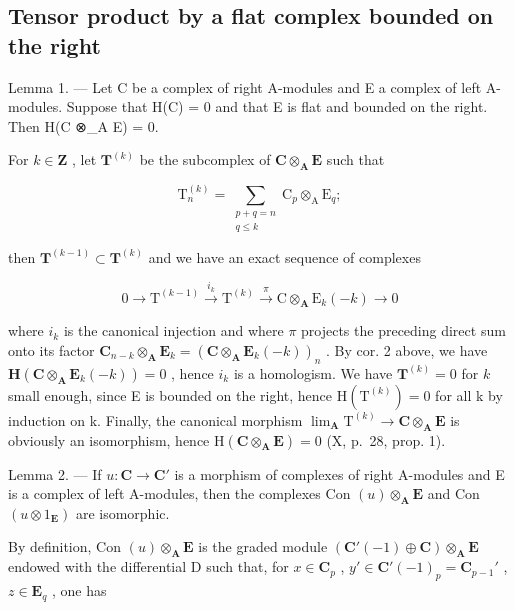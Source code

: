 \subsection{Tensor product by a flat complex bounded on the right}

Lemma 1. --- Let C be a complex of right A-modules and E a complex of left A-modules. Suppose that H(C) = 0 and that E is flat and bounded on the right. Then H(C ⊗\_A E) = 0.

For \(k \in \mathbf{Z}\) , let \(\mathbf{T}^{(k)}\) be the subcomplex of \(\mathbf{C} \otimes_{\mathbf{A}} \mathbf{E}\) such that

\[
\mathrm{T}_{n}^{(k)} = \sum_{\substack{p + q = n\\ q\leqslant k}}\mathrm{C}_{p}\otimes_{\mathrm{A}}\mathrm{E}_{q};
\]

then \(\mathbf{T}^{(k - 1)}\subset \mathbf{T}^{(k)}\) and we have an exact sequence of complexes

\[
0 \longrightarrow \mathrm{T} ^ {(k - 1)} \stackrel {i _ {k}} {\longrightarrow} \mathrm{T} ^ {(k)} \stackrel {\pi} {\longrightarrow} \mathrm{C} \otimes_ {\mathbf {A}} \mathrm{E} _ {k} (- k) \longrightarrow 0
\]

where \(i_{k}\) is the canonical injection and where \(\pi\) projects the preceding direct sum onto its factor \(\mathbf{C}_{n-k} \otimes_{\mathbf{A}} \mathbf{E}_{k} = (\mathbf{C} \otimes_{\mathbf{A}} \mathbf{E}_{k}(-k))_{n}\) . By cor. 2 above, we have \(\mathbf{H}(\mathbf{C} \otimes_{\mathbf{A}} \mathbf{E}_{k}(-k)) = 0\) , hence \(i_{k}\) is a homologism. We have \(\mathbf{T}^{(k)} = 0\) for \(k\) small enough, since E is bounded on the right, hence \(\mathrm{H}(\mathrm{T}^{(k)}) = 0\) for all k by induction on k. Finally, the canonical morphism \(\lim_{\mathbf{A}} \mathrm{T}^{(k)} \to \mathbf{C} \otimes_{\mathbf{A}} \mathbf{E}\) is obviously an isomorphism, hence \(\mathrm{H}(\mathbf{C} \otimes_{\mathbf{A}} \mathbf{E}) = 0\) (X, p.~28, prop. 1).

Lemma 2. --- If \(u: \mathbf{C} \to \mathbf{C}'\) is a morphism of complexes of right A-modules and E is a complex of left A-modules, then the complexes Con \((u) \otimes_{\mathbf{A}} \mathbf{E}\) and Con \((u \otimes 1_{\mathbf{E}})\) are isomorphic.

By definition, Con \((u) \otimes_{\mathbf{A}} \mathbf{E}\) is the graded module \((\mathbf{C}'(-1) \oplus \mathbf{C}) \otimes_{\mathbf{A}} \mathbf{E}\) endowed with the differential D such that, for \(x \in \mathbf{C}_p\) , \(y' \in \mathbf{C}'(-1)_p = \mathbf{C}_{p-1}'\) , \(z \in \mathbf{E}_q\) , one has

